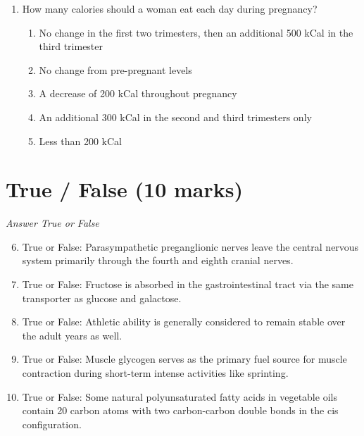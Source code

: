 \documentclass[12pt]{article}
\begin{document}
\begin{enumerate}[label=\arabic*.]
\begin{enumerate}[label=(\alph*)]
    \item Vitamin D supplements
    \item Fruit and vegetables
    \item Salt
    \item Red meat
    \item Dairy products
\end{enumerate}
\item How many calories should a woman eat each day during pregnancy?
\begin{enumerate}[label=(\alph*)]
    \item No change in the first two trimesters, then an additional 500 kCal in the third trimester
    \item No change from pre-pregnant levels
    \item A decrease of 200 kCal throughout pregnancy
    \item An additional 300 kCal in the second and third trimesters only
    \item Less than 200 kCal
\end{enumerate}
\end{enumerate}

\section*{True / False (10 marks)}
\textit{Answer True or False}
\begin{enumerate}[label=\arabic*.]
\setcounter{enumi}{5}
\item True or False: Parasympathetic preganglionic nerves leave the central nervous system primarily through the fourth and eighth cranial nerves.
\item True or False: Fructose is absorbed in the gastrointestinal tract via the same transporter as glucose and galactose.
\item True or False: Athletic ability is generally considered to remain stable over the adult years as well.
\item True or False: Muscle glycogen serves as the primary fuel source for muscle contraction during short-term intense activities like sprinting.
\item True or False: Some natural polyunsaturated fatty acids in vegetable oils contain 20 carbon atoms with two carbon-carbon double bonds in the cis configuration.
\end{enumerate}
\end{document}
